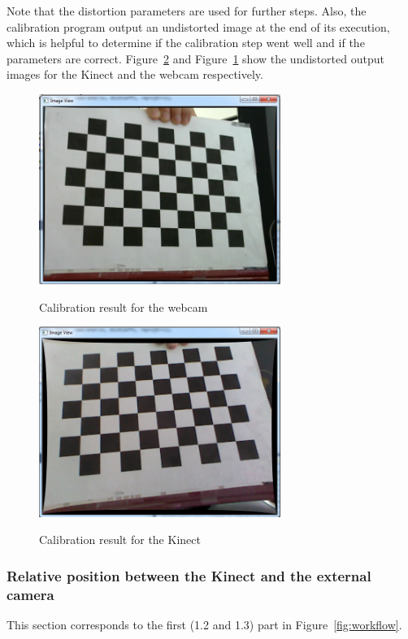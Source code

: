 Note that the distortion parameters are used for further steps. Also, the calibration program output an undistorted image at the end of its execution, which is helpful to determine if the calibration step went well and if the parameters are correct. Figure~\ref{fig:calibration result for the kinect} and Figure~\ref{fig:calibration result for the webcam} show the undistorted output images for the Kinect and the webcam respectively.        

\begin{figure}
\caption{Calibration result for the webcam}
\centering
    \includegraphics[width=0.7\textwidth]{images/resultCalibWebcam.png}
\label{fig:calibration result for the webcam}
\end{figure}

\begin{figure}
\caption{Calibration result for the Kinect}
\centering
    \includegraphics[width=0.7\textwidth]{images/resultCalibKinect.png}
\label{fig:calibration result for the kinect}
\end{figure}

\subsubsection{Relative position between the Kinect and the external camera}
\label{sec:Relative position between the Kinect and the external camera}
This section corresponds to the first (1.2 and 1.3) part in Figure~\ref{fig:workflow}.\\

